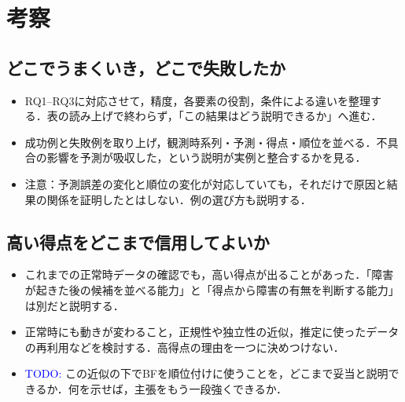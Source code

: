 \section{考察}
\label{sec:discussion}

\subsection{どこでうまくいき，どこで失敗したか}
\begin{itemize}
    \item RQ1--RQ3に対応させて，精度，各要素の役割，条件による違いを整理する．表の読み上げで終わらず，「この結果はどう説明できるか」へ進む．
    \item 成功例と失敗例を取り上げ，観測時系列・予測・得点・順位を並べる．不具合の影響を予測が吸収した，という説明が実例と整合するかを見る．
    \item 注意：予測誤差の変化と順位の変化が対応していても，それだけで原因と結果の関係を証明したとはしない．例の選び方も説明する．
\end{itemize}

\subsection{高い得点をどこまで信用してよいか}
\begin{itemize}
    \item これまでの正常時データの確認でも，高い得点が出ることがあった．「障害が起きた後の候補を並べる能力」と「得点から障害の有無を判断する能力」は別だと説明する．
    \item 正常時にも動きが変わること，正規性や独立性の近似，推定に使ったデータの再利用などを検討する．高得点の理由を一つに決めつけない．
    \item \textcolor{blue}{TODO:} この近似の下でBFを順位付けに使うことを，どこまで妥当と説明できるか．何を示せば，主張をもう一段強くできるか．
\end{itemize}


